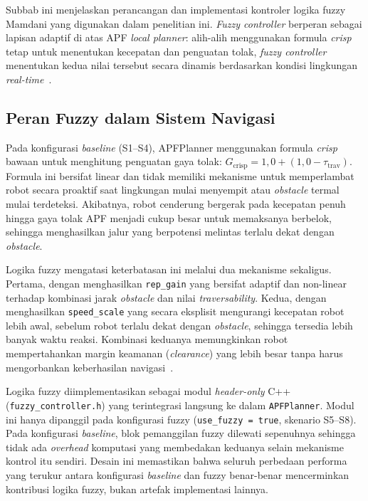 Subbab ini menjelaskan perancangan dan implementasi kontroler logika fuzzy Mamdani yang digunakan dalam penelitian ini. \textit{Fuzzy controller} berperan sebagai lapisan adaptif di atas APF \textit{local planner}: alih-alih menggunakan formula \textit{crisp} tetap untuk menentukan kecepatan dan penguatan tolak, \textit{fuzzy controller} menentukan kedua nilai tersebut secara dinamis berdasarkan kondisi lingkungan \textit{real-time}~\cite{Mamdani1974}.

\subsection{Peran Fuzzy dalam Sistem Navigasi}
\label{sec:fuzzy_peran}

Pada konfigurasi \textit{baseline} (S1--S4), APFPlanner menggunakan formula \textit{crisp} bawaan untuk menghitung penguatan gaya tolak:
$G_\text{crisp} = 1{,}0 + (1{,}0 - \tau_\text{trav})$. Formula ini bersifat linear dan tidak memiliki mekanisme untuk memperlambat robot secara proaktif saat lingkungan mulai menyempit atau \textit{obstacle} termal mulai terdeteksi. Akibatnya, robot cenderung bergerak pada kecepatan penuh hingga gaya tolak APF menjadi cukup besar untuk memaksanya berbelok, sehingga menghasilkan jalur yang berpotensi melintas terlalu dekat dengan \textit{obstacle}.

Logika fuzzy mengatasi keterbatasan ini melalui dua mekanisme sekaligus. Pertama, dengan menghasilkan \texttt{rep\_gain} yang bersifat adaptif dan non-linear terhadap kombinasi jarak \textit{obstacle} dan nilai \textit{traversability}. Kedua, dengan menghasilkan \texttt{speed\_scale} yang secara eksplisit mengurangi kecepatan robot lebih awal, sebelum robot terlalu dekat dengan \textit{obstacle}, sehingga tersedia lebih banyak waktu reaksi. Kombinasi keduanya memungkinkan robot mempertahankan margin keamanan (\textit{clearance}) yang lebih besar tanpa harus mengorbankan keberhasilan navigasi~\cite{Haider2022,Benaicha2026}.

Logika fuzzy diimplementasikan sebagai modul \textit{header-only} C++ (\texttt{fuzzy\_controller.h}) yang terintegrasi langsung ke dalam \texttt{APFPlanner}. Modul ini hanya dipanggil pada konfigurasi fuzzy (\texttt{use\_fuzzy = true}, skenario S5--S8). Pada konfigurasi \textit{baseline}, blok pemanggilan fuzzy dilewati sepenuhnya sehingga tidak ada \textit{overhead} komputasi yang membedakan keduanya selain mekanisme kontrol itu sendiri. Desain ini memastikan bahwa seluruh perbedaan performa yang terukur antara konfigurasi \textit{baseline} dan fuzzy benar-benar mencerminkan kontribusi logika fuzzy, bukan artefak implementasi lainnya.

